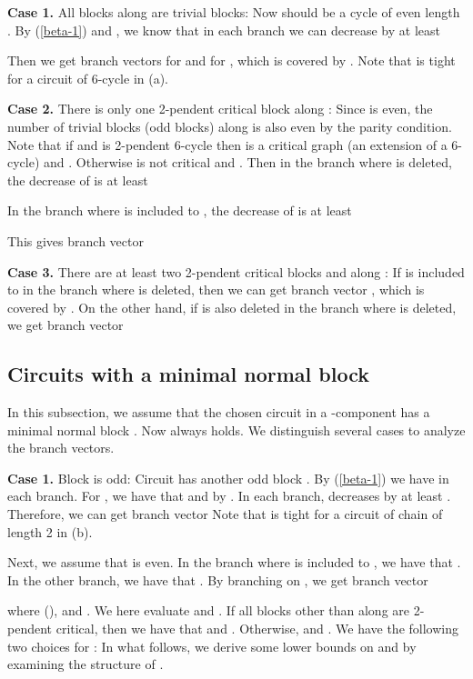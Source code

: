 \documentclass[runningheads]{llncs}
\begin{document}
{\bf Case 1.} All blocks along  are trivial blocks: Now  should be a cycle of even length .
By (\ref{beta-1}) and , we know that
in each branch we can decrease  by at least
 
Then we get branch vectors
for  
and  for ,
 which is covered by .
Note that  is tight for a circuit of 6-cycle in (a).


{\bf Case 2.} There is only one 2-pendent critical block  along :
Since  is even, the number  of trivial blocks (odd blocks) along  is also even by the parity condition.
Note that if  and  is 2-pendent 6-cycle then  is a critical graph (an extension of a 6-cycle) and . Otherwise  is not critical and .
Then in the branch where  is deleted, the  decrease  of  is at least


In the branch where  is included to , the  decrease  of  is at least

This gives branch vector

{\bf Case 3.} There are at least two 2-pendent critical blocks  and  along :
If  is included to  in the branch where  is deleted,
then we can get branch vector
, which is covered by .
On the other hand, if  is also deleted in the branch where  is deleted, we get branch vector


\subsection{Circuits with a minimal normal block}
In this subsection, we assume that the chosen circuit  in a -component 
has a minimal normal block . Now  always holds.
We distinguish several cases to analyze the branch vectors.


{\bf Case 1.} Block  is odd: Circuit   has another odd block .
By (\ref{beta-1}) we have  
  in each branch.
For , we have that
 and  by .
In each branch,    decreases by at least
.
Therefore, we can get
branch vector
Note that  is tight for a circuit of chain of length 2 in (b).

\bigskip
Next, we assume that  is even.
In the branch where  is included to , we have that .
In the other branch, we have that .
By branching on , we get branch vector

where  (),  and .
We here evaluate  and .
If all blocks other than  along  are 2-pendent critical, then we have that  and .
Otherwise,  and .
We have the following two choices for :
In what follows,   we derive some lower bounds on  and 
by examining the structure of .
\end{document}
